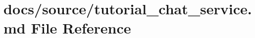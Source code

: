 \hypertarget{tutorial__chat__service_8md}{}\section{docs/source/tutorial\+\_\+chat\+\_\+service.md File Reference}
\label{tutorial__chat__service_8md}
